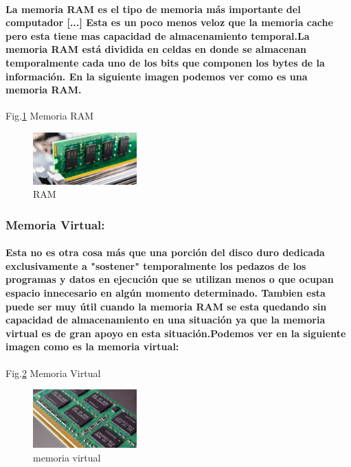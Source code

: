 \documentclass{article}
\begin{document}
\paragraph{La memoria RAM es el tipo de memoria más importante del computador [...] Esta es un poco menos veloz que la memoria cache pero esta tiene mas capacidad de almacenamiento temporal.La memoria RAM está dividida en celdas en donde se almacenan temporalmente cada uno de los bits que componen los bytes de la información. En la siguiente imagen podemos ver como es una memoria RAM.\cite{taller}}

Fig.\ref{fig:RAM} Memoria RAM
    \begin{figure}[h]
    \includegraphics[width=4cm]{RAM.jpg}
    \centering
    \caption{RAM}
    \label{fig:RAM}
    \end{figure}
\subsubsection{Memoria Virtual:}

\paragraph{Esta no es otra cosa más que una porción del disco duro dedicada exclusivamente a "sostener" temporalmente los pedazos de los programas y datos en ejecución que se utilizan menos o que ocupan espacio innecesario en
algún momento determinado.\cite{taller} Tambien esta puede ser muy útil cuando la memoria RAM se esta quedando sin capacidad de almacenamiento en una situación ya que la memoria virtual es de gran apoyo en esta situación.Podemos ver en la siguiente imagen como es la memoria virtual:}

Fig.\ref{fig:memoria virtual} Memoria Virtual
    \begin{figure}[h]
    \includegraphics[width=4cm]{memoria virtual.jpg}
    \centering
    \caption{memoria virtual}
    \label{fig:memoria virtual}
    \end{figure}
    
\end{document}
